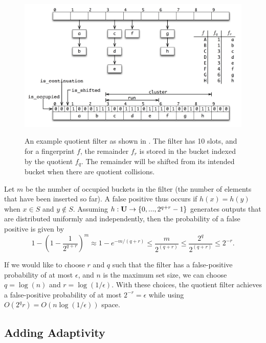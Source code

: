 \documentclass[../paper.tex]{subfiles}
\begin{document}
    \begin{figure}
      \centering
        \includegraphics[scale=0.3]{qf.png}
      \label{fig:qf}
        \caption{An example quotient filter as shown in \cite{quotient-filter}. The filter has 10 slots,
        and for a fingerprint $f$, the remainder $f_r$ is stored in the bucket indexed by the quotient $f_q$. The
        remainder will be shifted from its intended bucket when there are quotient collisions.}  
    \end{figure}

    
    Let $m$ be the number of occupied buckets in the filter (the number of elements that have been inserted so far). A false positive thus occurs if $h(x) =
    h(y)$ when $x \in S$ and $y \notin S$.  Assuming $h: {\bf U} \rightarrow
    \{0, ... , 2^{q+r}-1\}$ generates outputs that are distributed uniformly
    and independently, then the probability of a false positive is given by $$
    1 - \left(1 - \frac{1}{2^{q+r}}\right)^m \approx 1- e^{-m/(q+r)} \leq
    \frac{m}{2^{(q+r)}} \leq \frac{2^q}{2^{(q+r)}} \leq 2^{-r}.$$

    If we would like to choose $r$ and $q$ such that the filter has a false-positive
    probability of at most $\epsilon$, and $n$ is the maximum set size, we can choose $q=\log(n)$
    and $r=\log(1/\epsilon)$.
    With these choices, the quotient filter achieves a false-positive probability of at most
    $2^{-r} = \epsilon$ while using $O(2^q r) = O(n \log (1/\epsilon))$ space.  	

\subsection{Adding Adaptivity}
\end{document}
